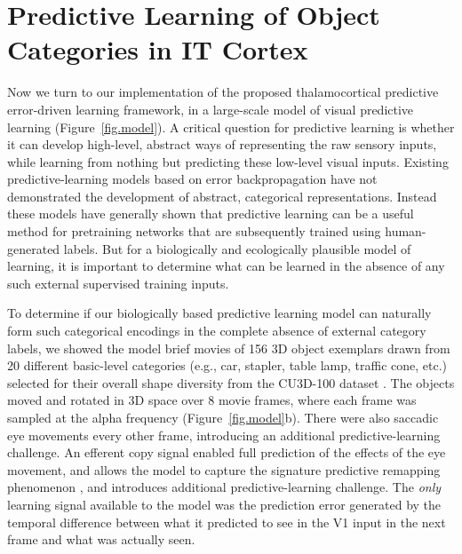 \documentclass[11pt,twoside]{article}
\newif\myifpdf
\begin{document}
\section{Predictive Learning of Object Categories in IT Cortex}

Now we turn to our implementation of the proposed thalamocortical predictive error-driven learning framework, in a large-scale model of visual predictive learning (Figure~\ref{fig.model}).  A critical question for predictive learning is whether it can develop high-level, abstract ways of representing the raw sensory inputs, while learning from nothing but predicting these low-level visual inputs.  Existing predictive-learning models based on error backpropagation \cite{LotterKreimanCox16,JakeAddOthers} have not demonstrated the development of abstract, categorical representations.  Instead these models have generally shown that predictive learning can be a useful method for pretraining networks that are subsequently trained using human-generated labels.  But for a biologically and ecologically plausible model of learning, it is important to determine what can be learned in the absence of any such external supervised training inputs.

To determine if our biologically based predictive learning model can naturally form such categorical encodings in the complete absence of external category labels, we showed the model brief movies of 156 3D object exemplars drawn from 20 different basic-level categories (e.g., car, stapler, table lamp, traffic cone, etc.) selected for their overall shape diversity from the CU3D-100 dataset \cite{OReillyWyatteHerdEtAl13}.  The objects moved and rotated in 3D space over 8 movie frames, where each frame was sampled at the alpha frequency (Figure~\ref{fig.model}b).  There were also saccadic eye movements every other frame, introducing an additional predictive-learning challenge.  An efferent copy signal enabled full prediction of the effects of the eye movement, and allows the model to capture the signature predictive remapping phenomenon \cite{DuhamelColbyGoldberg92,CavanaghHuntAfrazEtAl10}, and introduces additional predictive-learning challenge.  The \emph{only} learning signal available to the model was the prediction error generated by the temporal difference between what it predicted to see in the V1 input in the next frame and what was actually seen.
\end{document}
